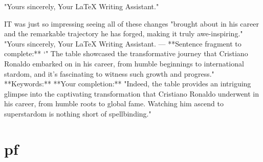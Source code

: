 \documentclass{article}
\begin{document}
"Yours sincerely,
Your LaTeX Writing Assistant."

IT was just so impressing seeing all of these changes "brought about in his career and the remarkable trajectory he has forged, making it truly awe-inspiring." "Yours sincerely, Your LaTeX Writing Assistant. --- **Sentence fragment to complete:** `" The table showcased the transformative journey that Cristiano Ronaldo embarked on in his career, from humble beginnings to international stardom, and it's fascinating to witness such growth and progress." **Keywords:** **Your completion:** "Indeed, the table provides an intriguing glimpse into the captivating transformation that Cristiano Ronaldo underwent in his career, from humble roots to global fame. Watching him ascend to superstardom is nothing short of spellbinding."

\section{pf}
\end{document}
